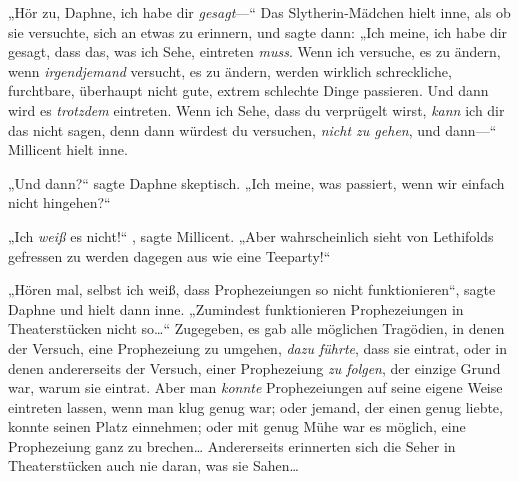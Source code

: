 „Hör zu, Daphne, ich habe dir \emph{gesagt}—“ Das Slytherin-Mädchen hielt inne, als ob sie versuchte, sich an etwas zu erinnern, und sagte dann: „Ich meine, ich habe dir gesagt, dass das, was ich Sehe, eintreten \emph{muss}. Wenn ich versuche, es zu ändern, wenn \emph{irgendjemand} versucht, es zu ändern, werden wirklich schreckliche, furchtbare, überhaupt nicht gute, extrem schlechte Dinge passieren. Und dann wird es \emph{trotzdem} eintreten. Wenn ich Sehe, dass du verprügelt wirst, \emph{kann} ich dir das nicht sagen, denn dann würdest du versuchen, \emph{nicht zu gehen}, und dann—“ Millicent hielt inne.

„Und dann?“ sagte Daphne skeptisch. „Ich meine, was passiert, wenn wir einfach nicht hingehen?“

„Ich \emph{weiß} es nicht!“ , sagte Millicent. „Aber wahrscheinlich sieht von Lethifolds gefressen zu werden dagegen aus wie eine Teeparty!“

„Hören mal, selbst ich weiß, dass Prophezeiungen so nicht funktionieren“, sagte Daphne und hielt dann inne. „Zumindest funktionieren Prophezeiungen in Theaterstücken nicht so…“ Zugegeben, es gab alle möglichen Tragödien, in denen der Versuch, eine Prophezeiung zu umgehen, \emph{dazu führte}, dass sie eintrat, oder in denen andererseits der Versuch, einer Prophezeiung \emph{zu folgen}, der einzige Grund war, warum sie eintrat. Aber man \emph{konnte} Prophezeiungen auf seine eigene Weise eintreten lassen, wenn man klug genug war; oder jemand, der einen genug liebte, konnte seinen Platz einnehmen; oder mit genug Mühe war es möglich, eine Prophezeiung ganz zu brechen… Andererseits erinnerten sich die Seher in Theaterstücken auch nie daran, was sie Sahen…

